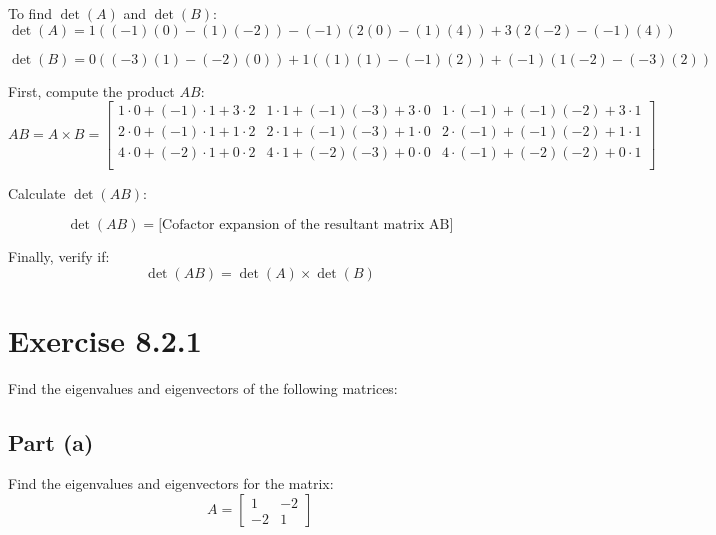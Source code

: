 \documentclass[12pt]{article}
\begin{document}
To find \( \det(A) \) and \( \det(B) \):
\[
  \det(A) = 1 \left((-1)(0) - (1)(-2)\right) - (-1) \left(2(0) - (1)(4)\right) + 3 \left(2(-2) - (-1)(4)\right)
\]

\[
  \det(B) = 0 \left((-3)(1) - (-2)(0)\right) + 1 \left((1)(1) - (-1)(2)\right) + (-1) \left(1(-2) - (-3)(2)\right)
\]


First, compute the product \( AB \):
\[
  AB = A \times B = \begin{bmatrix}
    1\cdot0 + (-1)\cdot1 + 3\cdot2 & 1\cdot1 + (-1)(-3) + 3\cdot0 & 1\cdot(-1) + (-1)(-2) + 3\cdot1 \\
    2\cdot0 + (-1)\cdot1 + 1\cdot2 & 2\cdot1 + (-1)(-3) + 1\cdot0 & 2\cdot(-1) + (-1)(-2) + 1\cdot1 \\
    4\cdot0 + (-2)\cdot1 + 0\cdot2 & 4\cdot1 + (-2)(-3) + 0\cdot0 & 4\cdot(-1) + (-2)(-2) + 0\cdot1 \\
  \end{bmatrix}
\]

Calculate \( \det(AB) \):

\[
  \det(AB) = \text{[Cofactor expansion of the resultant matrix AB]}
\]

Finally, verify if:
\[
  \det(AB) = \det(A) \times \det(B)
\]

\pagebreak

\section*{Exercise 8.2.1}
Find the eigenvalues and eigenvectors of the following matrices:

\subsection*{Part (a)}
Find the eigenvalues and eigenvectors for the matrix:
\[
  A = \begin{bmatrix} 1 & -2 \\ -2 & 1 \end{bmatrix}
\]
\end{document}
